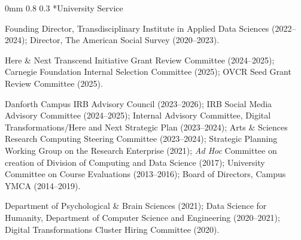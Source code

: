\documentclass[10pt]{article}
\makeatletter
\renewcommand{\subsection}{\@startsection{subsection}{2}
{0mm}
{0.8\baselineskip}
{0.3\baselineskip}
{\normalsize\scshape}}
\newenvironment{CVwide}
  {\begin{list}{}
    {\renewcommand{\makelabel}{\entrylabel}
    \setlength{\labelwidth}{85pt}
    \setlength{\leftmargin}{92pt}
  }}
  {\end{list}}
\makeatother
\begin{document}
\subsection*{University Service}
\begin{CVwide}
\item[\textbf{Leadership}] Founding Director, Transdisciplinary Institute in Applied Data Sciences (2022--2024); Director, The American Social Survey (2020--2023).

\item[\textbf{Grant Review}] Here \& Next Transcend Initiative Grant Review Committee (2024--2025); Carnegie Foundation Internal Selection Committee (2025); OVCR Seed Grant Review Committee (2025).

\item[\textbf{Advisory}] Danforth Campus IRB Advisory Council (2023--2026); IRB Social Media Advisory Committee (2024--2025); Internal Advisory Committee, Digital Transformations/Here and Next Strategic Plan (2023--2024); Arts \& Sciences Research Computing Steering Committee (2023--2024); Strategic Planning Working Group on the Research Enterprise (2021); \textit{Ad Hoc} Committee on creation of Division of Computing and Data Science (2017); University Committee on Course Evaluations (2013--2016); Board of Directors, Campus YMCA (2014--2019).

\item[\textbf{Searches}] Department of Psychological \& Brain Sciences (2021); Data Science for Humanity, Department of Computer Science and Engineering (2020--2021); Digital Transformations Cluster Hiring Committee (2020).
\end{CVwide}
\end{document}
